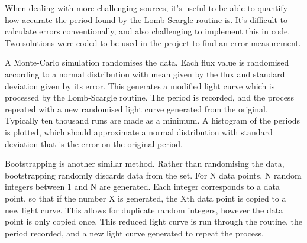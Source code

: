 When dealing with more challenging sources, it\textquoteright{}s useful to be able to quantify how accurate the period found by the Lomb-Scargle routine is. It\textquoteright{}s difficult to calculate errors conventionally, and also challenging to implement this in code. Two solutions were coded to be used in the project to find an error measurement. 

A Monte-Carlo simulation randomises the data. Each flux value is randomised according to a normal distribution with mean given by the flux and standard deviation given by its error. This generates a modified light curve which is processed by the Lomb-Scargle routine. The period is recorded, and the process repeated with a new randomised light curve generated from the original. Typically ten thousand runs are made as a minimum. A histogram of the periods is plotted, which should approximate a normal distribution with standard deviation that is the error on the original period.

Bootstrapping is another similar method. Rather than randomising the data, bootstrapping randomly discards data from the set. For N data points, N random integers between 1 and N are generated. Each integer corresponds to a data point, so that if the number X is generated, the Xth data point is copied to a new light curve. This allows for duplicate random integers, however the data point is only copied once. This reduced light curve is run through the routine, the period recorded, and a new light curve generated to repeat the process. 
